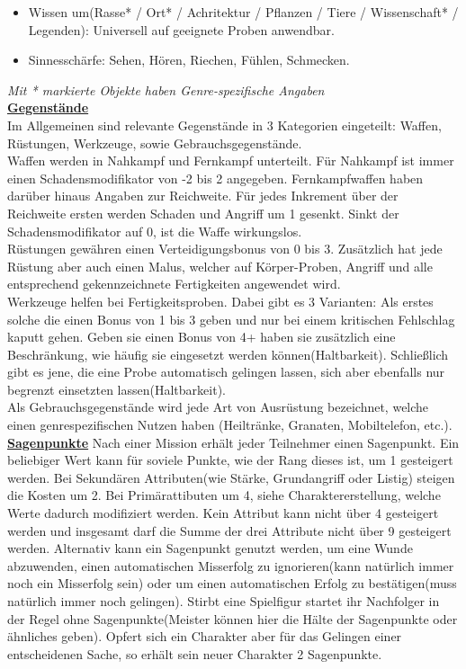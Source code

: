 \documentclass[twoside,a4paper]{minimal}
\begin{document}
\begin{multicols*}{3}
\begin{itemize}
\item Wissen um(Rasse* / Ort* / Achritektur / Pflanzen / Tiere / Wissenschaft* / Legenden): Universell auf geeignete Proben anwendbar.
\item Sinnesschärfe: Sehen, Hören, Riechen, Fühlen, Schmecken.
\end{itemize}
\textit{Mit * markierte Objekte haben Genre-spezifische Angaben}
\textbf{\uline{\\Gegenstände}}
\\Im Allgemeinen sind relevante Gegenstände in 3 Kategorien eingeteilt: Waffen, Rüstungen, Werkzeuge, sowie Gebrauchsgegenstände.
\\Waffen werden in Nahkampf und Fernkampf unterteilt. Für Nahkampf ist immer einen Schadensmodifikator von -2 bis 2 angegeben. Fernkampfwaffen haben darüber hinaus Angaben zur Reichweite. Für jedes Inkrement über der Reichweite ersten werden Schaden und Angriff um 1 gesenkt. Sinkt der Schadensmodifikator auf 0, ist die Waffe wirkungslos.
\\Rüstungen gewähren einen Verteidigungsbonus von 0 bis 3. Zusätzlich hat jede Rüstung aber auch einen Malus, welcher auf Körper-Proben, Angriff und alle entsprechend gekennzeichnete Fertigkeiten angewendet wird.
\\Werkzeuge helfen bei Fertigkeitsproben. Dabei gibt es 3 Varianten: Als erstes solche die einen Bonus von 1 bis 3 geben und nur bei einem kritischen Fehlschlag kaputt gehen. Geben sie einen Bonus von 4+ haben sie zusätzlich eine Beschränkung, wie häufig sie eingesetzt werden können(Haltbarkeit). Schließlich gibt es jene, die eine Probe automatisch gelingen lassen, sich aber ebenfalls nur begrenzt einsetzten lassen(Haltbarkeit).
\\Als Gebrauchsgegenstände wird jede Art von Ausrüstung bezeichnet, welche einen genrespezifischen Nutzen haben (Heiltränke, Granaten, Mobiltelefon, etc.).
\textbf{\uline{\\Sagenpunkte}}
Nach einer Mission erhält jeder Teilnehmer einen Sagenpunkt. Ein beliebiger Wert kann für soviele Punkte, wie der Rang dieses ist, um 1 gesteigert werden. Bei Sekundären Attributen(wie Stärke, Grundangriff oder Listig) steigen die Kosten um 2. Bei Primärattibuten um 4, siehe Charaktererstellung, welche Werte dadurch modifiziert werden. Kein Attribut kann nicht über 4 gesteigert werden und insgesamt darf die Summe der drei Attribute nicht über 9 gesteigert werden. Alternativ kann ein Sagenpunkt genutzt werden, um eine Wunde abzuwenden, einen automatischen Misserfolg zu ignorieren(kann natürlich immer noch ein Misserfolg sein) oder um einen automatischen Erfolg zu bestätigen(muss natürlich immer noch gelingen). Stirbt eine Spielfigur startet ihr Nachfolger in der Regel ohne Sagenpunkte(Meister können hier die Hälte der Sagenpunkte oder ähnliches geben). Opfert sich ein Charakter aber für das Gelingen einer entscheidenen Sache, so erhält sein neuer Charakter 2 Sagenpunkte. 

\end{multicols*}
\end{document}
